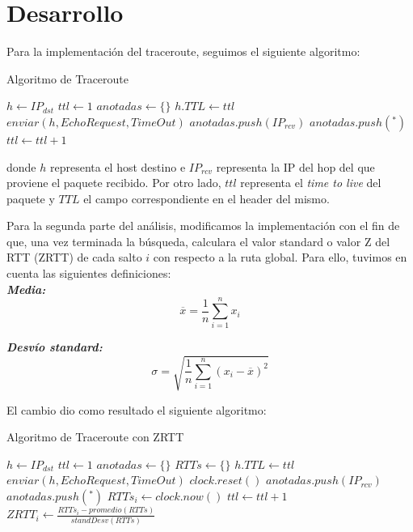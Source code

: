 \documentclass[10pt, a4paper]{article}
\begin{document}
\section{Desarrollo}
Para la implementación del traceroute, seguimos el siguiente algoritmo:

\begin{algorithm}
\caption{Algoritmo de Traceroute}
\begin{algorithmic}

\State $h\gets IP_{dst}$
\State $ttl\gets 1$
\State $anotadas \gets \{\}$
\Repeat
	\State $h.TTL \gets ttl$
	\State $enviar(h, EchoRequest, TimeOut)$
    	\State $anotadas.push(IP_{rcv})$
    \Else
    	\State $anotadas.push(^*)$
    \EndIf
    \State $ttl\gets ttl+1$
\EndProcedure
\end{algorithmic}
\end{algorithm}

donde $h$ representa el host destino e $IP_{rcv}$ representa la IP del hop del que proviene el paquete recibido. Por otro lado, $ttl$ representa el \textit{time to live} del paquete y $TTL$ el campo correspondiente en el header del mismo.

Para la segunda parte del análisis, modificamos la implementación con el fin de que, una vez terminada la búsqueda, calculara el valor standard o valor Z del RTT (ZRTT) de cada salto $i$ con respecto a la ruta global. Para ello, tuvimos en cuenta las siguientes definiciones:\\

\textit{\textbf{Media:}}
$$\overline{x} = \frac{1}{n} \sum_{i=1}^{n}x_i$$


\textit{\textbf{Desvío standard:}}
$$\sigma = \sqrt{\frac{1}{n} \sum_{i=1}^{n}(x_i - \overline{x})^2}$$

El cambio dio como resultado el siguiente algoritmo:

\begin{algorithm}[H]
\caption{Algoritmo de Traceroute con ZRTT}
\begin{algorithmic}

\State $h\gets IP_{dst}$
\State $ttl\gets 1$
\State $anotadas \gets \{\}$
\State $RTTs \gets \{\}$
\Repeat
	\State $h.TTL \gets ttl$
	\State $enviar(h, EchoRequest, TimeOut)$
	\State $clock.reset()$
    	\State $anotadas.push(IP_{rcv})$
    \Else
    	\State $anotadas.push(^*)$
    \EndIf
    \State $RTTs_i \gets clock.now()$
    \State $ttl\gets ttl+1$
    \State $ZRTT_i \gets \frac{RTTs_i - promedio(RTTs)}{standDesv(RTTs)}$
\EndProcedure
\end{algorithmic}
\end{algorithm}
\end{document}
